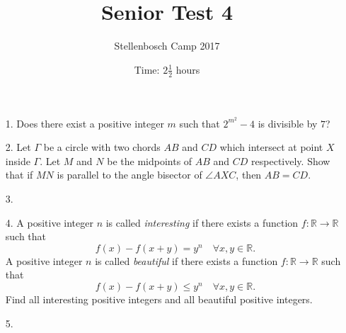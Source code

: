\documentclass[12pt]{article}
\title{Senior Test 4}
\author{Stellenbosch Camp 2017}
\date{Time: $2\frac{1}{2}$ hours}
\begin{document}
 \maketitle

\begin{enumerate}

\item[1.] %
Does there exist a positive integer $m$ such that $2^{m^2} - 4$ is divisible by $7$?


\item[2.] %
Let $\Gamma$ be a circle with two chords $AB$ and $CD$ which intersect at point $X$ inside $\Gamma$. Let $M$ and $N$ be the midpoints of $AB$ and $CD$ respectively. Show that if $MN$ is parallel to the angle bisector of $\angle AXC$, then $AB = CD$.


\item[3.] %


\item[4.] %
A positive integer $n$ is called \emph{interesting} if there exists a function $f : \mathbb{R} \to \mathbb{R}$ such that
  \[ f(x) - f(x+y) = y^n \quad \forall x,y \in \mathbb{R}. \]
A positive integer $n$ is called \emph{beautiful} if there exists a function $f : \mathbb{R} \to\mathbb{R}$ such that
  \[ f(x) - f(x+y) \leq y^n \quad \forall x,y \in \mathbb{R}. \]
Find all interesting positive integers and all beautiful positive integers.
 

\item[5.] %


\end{enumerate}
\end{document}

